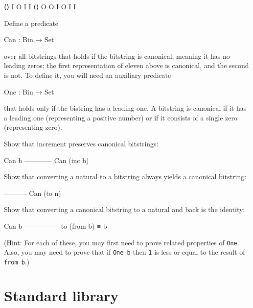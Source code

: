 \begin{myDisplay}
⟨⟩ I O I I
⟨⟩ O O I O I I
\end{myDisplay}

Define a predicate

\begin{myDisplay}
Can : Bin → Set
\end{myDisplay}

over all bitstrings that holds if the bitstring is canonical, meaning it
has no leading zeros; the first representation of eleven above is
canonical, and the second is not. To define it, you will need an
auxiliary predicate

\begin{myDisplay}
One : Bin → Set
\end{myDisplay}

that holds only if the bistring has a leading one. A bitstring is
canonical if it has a leading one (representing a positive number) or if
it consists of a single zero (representing zero).

Show that increment preserves canonical bitstrings:

\begin{myDisplay}
Can b
------------
Can (inc b)
\end{myDisplay}

Show that converting a natural to a bitstring always yields a canonical
bitstring:

\begin{myDisplay}
----------
Can (to n)
\end{myDisplay}

Show that converting a canonical bitstring to a natural and back is the
identity:

\begin{myDisplay}
Can b
---------------
to (from b) ≡ b
\end{myDisplay}

(Hint: For each of these, you may first need to prove related properties
of \texttt{One}. Also, you may need to prove that if \texttt{One\ b}
then \texttt{1} is less or equal to the result of \texttt{from\ b}.)

\begin{fence}
\begin{code}%
\>[0]\<%
\end{code}
\end{fence}

\hypertarget{standard-library}{%
\section{Standard library}\label{standard-library}}

